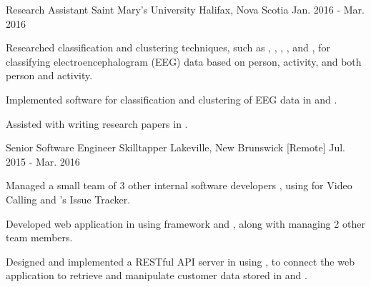 

\begin{cventries}

  \cventry
    {Research Assistant} %
    {Saint Mary's University} %
    {Halifax, Nova Scotia} %
    {Jan. 2016 - Mar. 2016} %
    {
      \begin{cvitems} %
        \item {Researched classification and clustering techniques, such as , , , , and , for classifying electroencephalogram (EEG) data based on person, activity, and both person and activity.}
        \item {Implemented software for classification and clustering of EEG data in  and .}
        \item {Assisted with writing research papers in .}
      \end{cvitems}
    }

  \cventry
    {Senior Software Engineer} %
    {Skilltapper} %
    {Lakeville, New Brunswick [Remote]} %
    {Jul. 2015 - Mar. 2016} %
    {
      \begin{cvitems} %
        \item {Managed a small team of 3 other internal software developers , using  for Video Calling and 's Issue Tracker.}
        \item {Developed web application in  using  framework and , along with managing 2 other team members.}
        \item {Designed and implemented a RESTful API server in  using , to connect the web application to retrieve and manipulate customer data stored in  and .}
      \end{cvitems}
    }


\end{cventries}
